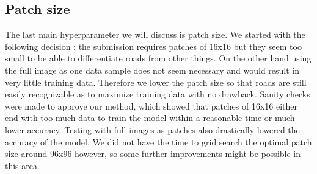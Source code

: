 \documentclass[10pt,conference,compsocconf]{IEEEtran}
\begin{document}
\subsection{Patch size}
The last main hyperparameter we will discuss is patch size. We started with the following decision : the submission requires patches of 16x16 but they seem too small to be able to differentiate roads from other things. On the other hand using the full image as one data sample does not seem necessary and would result in very little training data. Therefore we lower the patch size so that roads are still easily recognizable as to maximize training data with no drawback.
\newline
Sanity checks were made to approve our method, which showed that patches of 16x16 either end with too much data to train the model within a reasonable time or much lower accuracy. Testing with full images as patches also drastically lowered the accuracy of the model. We did not have the time to grid search the optimal patch size around 96x96 however, so some further improvements might be possible in this area.
\end{document}

